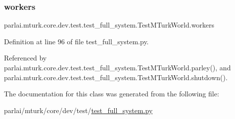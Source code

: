 \mbox{\label{classparlai_1_1mturk_1_1core_1_1dev_1_1test_1_1test__full__system_1_1TestMTurkWorld_abc8cda139731454801c07fcfec2a36b2}} 
\subsubsection{\texorpdfstring{workers}{workers}}
{\footnotesize\ttfamily parlai.\+mturk.\+core.\+dev.\+test.\+test\+\_\+full\+\_\+system.\+Test\+M\+Turk\+World.\+workers}



Definition at line 96 of file test\+\_\+full\+\_\+system.\+py.



Referenced by parlai.\+mturk.\+core.\+dev.\+test.\+test\+\_\+full\+\_\+system.\+Test\+M\+Turk\+World.\+parley(), and parlai.\+mturk.\+core.\+dev.\+test.\+test\+\_\+full\+\_\+system.\+Test\+M\+Turk\+World.\+shutdown().



The documentation for this class was generated from the following file\+:\begin{DoxyCompactItemize}
\item 
parlai/mturk/core/dev/test/\hyperlink{dev_2test_2test__full__system_8py}{test\+\_\+full\+\_\+system.\+py}\end{DoxyCompactItemize}
